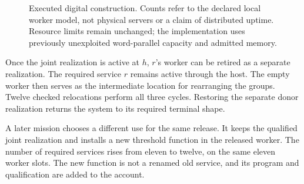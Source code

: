 \documentclass[11pt,letterpaper]{article}
\theoremstyle{definition}\newtheorem{definition}[theorem]{Definition}
\theoremstyle{remark}\newtheorem{remark}[theorem]{Remark}
\begin{document}
\begin{figure}[htbp]\centering
{}
\caption{Executed digital construction. Counts refer to the declared local worker model, not physical servers or a claim of distributed uptime. Resource limits remain unchanged; the implementation uses previously unexploited word-parallel capacity and admitted memory.}
\label{fig:headline}
\end{figure}

Once the joint realization is active at $h$, $r$'s worker can be retired as a separate realization. The required service $r$ remains active through the host. The empty worker then serves as the intermediate location for rearranging the groups. Twelve checked relocations perform all three cycles. Restoring the separate donor realization returns the system to its required terminal shape.

A later mission chooses a different use for the same release. It keeps the qualified joint realization and installs a new threshold function in the released worker. The number of required services rises from eleven to twelve, on the same eleven worker slots. The new function is not a renamed old service, and its program and qualification are added to the account.
\end{document}
